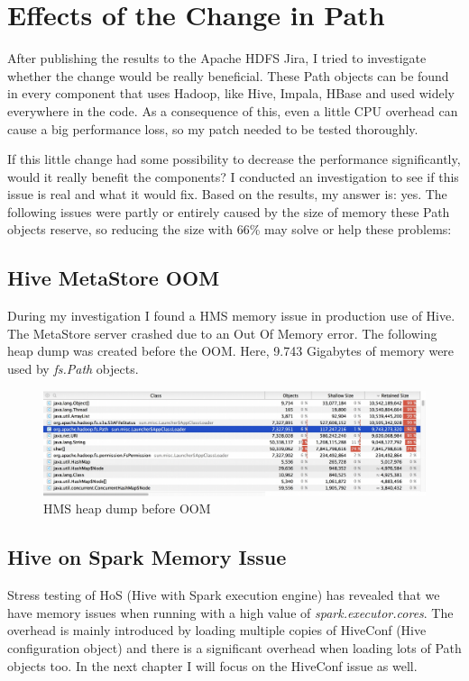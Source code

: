 \section{Effects of the Change in Path}
After publishing the results to the Apache HDFS Jira, I tried to investigate whether the change would be really beneficial. These Path objects can be found in every component that uses Hadoop, like Hive, Impala, HBase \etc and used widely everywhere in the code. As a consequence of this, even a little CPU overhead can cause a big performance loss, so my patch needed to be tested thoroughly. 

If this little change had some possibility to decrease the performance significantly, would it really benefit the components? I conducted an investigation to see if this issue is real and what it would fix. Based on the results, my answer is: yes. The following issues were partly or entirely caused by the size of memory these Path objects reserve, so reducing the size with 66\% may solve or help these problems:

\subsection{Hive MetaStore OOM}
During my investigation I found a HMS memory issue in production use of Hive. The MetaStore server crashed due to an Out Of Memory error. The following heap dump was created before the OOM. Here, 9.743 Gigabytes of memory were used by \textit{fs.Path} objects.

\begin{figure}[H]
	\includegraphics[width=150mm, keepaspectratio]{figures/hms_heapdump.png}
	\centering
	\caption{HMS heap dump before OOM}
\end{figure}

\subsection{Hive on Spark Memory Issue}
Stress testing of HoS (Hive with Spark execution engine) has revealed that we have memory issues when running with a high value of \textit{spark.executor.cores}. The overhead is mainly introduced by loading multiple copies of HiveConf (Hive configuration object) and there is a significant overhead when loading lots of Path objects too. In the next chapter I will focus on the HiveConf issue as well.

